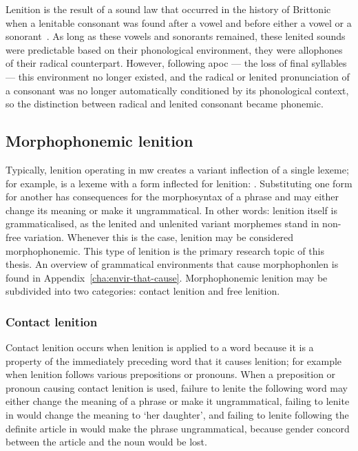 Lenition is the result of a sound law that occurred in the history of Brittonic when a lenitable consonant was found after a vowel and before either a vowel or a sonorant~\autocite[96]{mccone_towards_1996}. 
As long as these vowels and sonorants remained, these lenited sounds were predictable based on their phonological environment, \ie they were allophones of their radical counterpart. 
However, following \gls{apoc} --- the loss of final syllables --- this environment no longer existed, and the radical or lenited pronunciation of a consonant was no longer automatically conditioned by its phonological context, so the distinction between radical and lenited consonant became phonemic.

\subsection{Morphophonemic lenition}
\label{sec:morph-lenit}
Typically,  lenition operating in \gls{mw} creates a variant inflection of a single lexeme; for example,  is a lexeme with a form  inflected for lenition: . 
Substituting one form for another has consequences for the morphosyntax of a phrase and may either change its meaning or make it ungrammatical.
In other words: lenition itself is grammaticalised, as the lenited and unlenited variant morphemes stand in non-free variation. Whenever this is the case, lenition may be considered morphophonemic.
This type of lenition is the primary research topic of this thesis. An overview of grammatical environments that cause \gls{morphophonlen} is found in Appendix~\ref{cha:envir-that-cause}.
Morphophonemic lenition may be subdivided into two categories: contact lenition and free lenition.
\subsubsection{Contact lenition}
\label{sec:contact-lenition}
Contact lenition occurs when lenition is applied to a word because it is a property of the immediately preceding word that it causes lenition; for example when lenition follows various prepositions or pronouns. 
When a preposition or pronoun causing contact lenition is used, failure to lenite the following word may either change the meaning of a phrase or make it ungrammatical, \eg failing to lenite  in  would change the meaning to `her daughter', and failing to lenite following the definite article in  would make the phrase ungrammatical, because  gender concord between the article and the noun would be lost.

